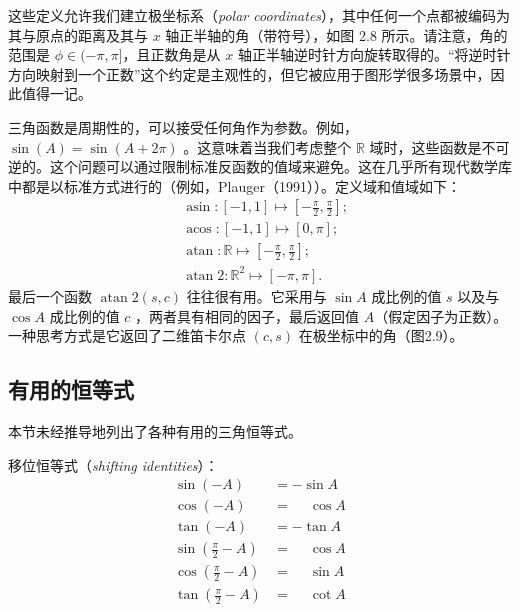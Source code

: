 这些定义允许我们建立极坐标系（\textit{polar coordinates}），其中任何一个点都被编码为其与原点的距离及其与 $x$ 轴正半轴的角（带符号），如图 2.8 所示。请注意，角的范围是 $\phi\in(-\pi,\pi]$，且正数角是从 $x$ 轴正半轴逆时针方向旋转取得的。“将逆时针方向映射到一个正数”这个约定是主观性的，但它被应用于图形学很多场景中，因此值得一记。


三角函数是周期性的，可以接受任何角作为参数。例如，$\sin(A) = \sin(A + 2\pi)$ 。这意味着当我们考虑整个 $\mathbb{R}$ 域时，这些函数是不可逆的。这个问题可以通过限制标准反函数的值域来避免。这在几乎所有现代数学库中都是以标准方式进行的（例如，Plauger（1991））。定义域和值域如下：
\begin{equation}
  \begin{aligned}
     & \operatorname{asin}:[-1,1] \mapsto[-\frac{\pi}{2}, \frac{\pi}{2}];      \\
     & \operatorname{acos}:[-1,1] \mapsto[0, \pi];                             \\
     & \operatorname{atan}: \mathbb{R} \mapsto[-\frac{\pi}{2}, \frac{\pi}{2}]; \\
     & \operatorname{atan} 2: \mathbb{R}^{2} \mapsto[-\pi, \pi].
  \end{aligned}
\end{equation}
最后一个函数 $\operatorname{atan}2(s,c)$ 往往很有用。它采用与 $\sin A$ 成比例的值 $s$ 以及与 $\cos A$ 成比例的值 $c$ ，两者具有相同的因子，最后返回值 $A$（假定因子为正数）。一种思考方式是它返回了二维笛卡尔点 $(c,s)$ 在极坐标中的角（图2.9）。


\subsection{有用的恒等式}

本节未经推导地列出了各种有用的三角恒等式。

移位恒等式（\textit{shifting identities}）：
\[
  \begin{aligned}
    \sin (-A)              & =-\sin A            \\
    \cos (-A)              & =\phantom{-} \cos A \\
    \tan (-A)              & =-\tan A            \\
    \sin (\frac{\pi}{2}-A) & =\phantom{-}\cos A  \\
    \cos (\frac{\pi}{2}-A) & =\phantom{-}\sin A  \\
    \tan (\frac{\pi}{2}-A) & =\phantom{-}\cot A
  \end{aligned}
\]

